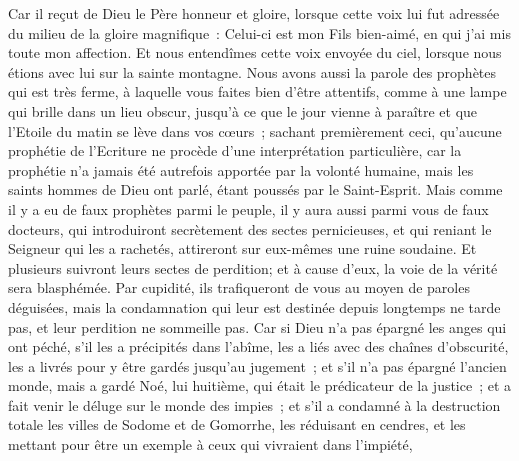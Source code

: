 \begin{multicols}{2}
Car il reçut de Dieu le Père honneur et gloire, lorsque cette voix lui fut adressée du milieu de la gloire magnifique~: Celui-ci est mon Fils bien-aimé, en qui j'ai mis toute mon affection.
Et nous entendîmes cette voix envoyée du ciel, lorsque nous étions avec lui sur la sainte montagne.
Nous avons aussi la parole des prophètes qui est très ferme, à laquelle vous faites bien d'être attentifs, comme à une lampe qui brille dans un lieu obscur, jusqu'à ce que le jour vienne à paraître et que l'Etoile du matin se lève dans vos cœurs~;
sachant premièrement ceci, qu'aucune prophétie de l'Ecriture ne procède d'une interprétation particulière,
car la prophétie n'a jamais été autrefois apportée par la volonté humaine, mais les saints hommes de Dieu ont parlé, étant poussés par le Saint-Esprit.
\VerseOne{}Mais comme il y a eu de faux prophètes parmi le peuple, il y aura aussi parmi vous de faux docteurs, qui introduiront secrètement des sectes pernicieuses, et qui reniant le Seigneur qui les a rachetés, attireront sur eux-mêmes une ruine soudaine. 
Et plusieurs suivront leurs sectes de perdition; et à cause d'eux, la voie de la vérité sera blasphémée.
Par cupidité, ils trafiqueront de vous au moyen de paroles déguisées, mais la condamnation qui leur est destinée depuis longtemps ne tarde pas, et leur perdition ne sommeille pas.
Car si Dieu n'a pas épargné les anges qui ont péché, s'il les a précipités dans l'abîme, les a liés avec des chaînes d'obscurité, les a livrés pour y être gardés jusqu'au jugement~;
et s'il n'a pas épargné l'ancien monde, mais a gardé Noé, lui huitième, qui était le prédicateur de la justice~; et a fait venir le déluge sur le monde des impies~;
et s'il a condamné à la destruction totale les villes de Sodome et de Gomorrhe, les réduisant en cendres, et les mettant pour être un exemple à ceux qui vivraient dans l'impiété,

\end{multicols}
